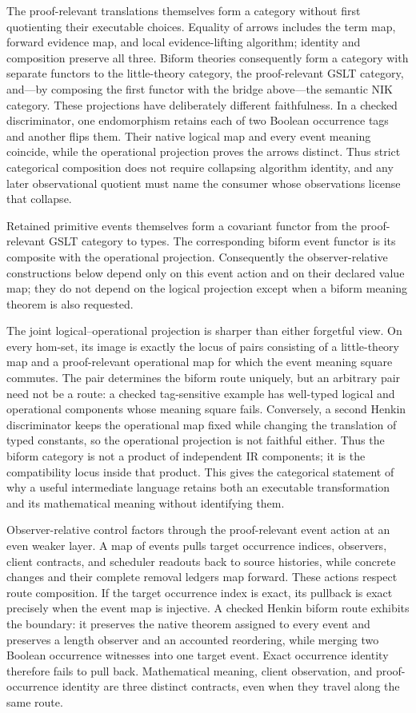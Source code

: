 \documentclass[11pt]{article}
\theoremstyle{definition}
\theoremstyle{remark}
\begin{document}
The proof-relevant translations themselves form a category without first
quotienting their executable choices.  Equality of arrows includes the term
map, forward evidence map, and local evidence-lifting algorithm; identity and
composition preserve all three.  Biform theories consequently form a category
with separate functors to the little-theory category, the proof-relevant GSLT
category, and---by composing the first functor with the bridge above---the
semantic NIK category.  These projections have deliberately different
faithfulness.  In a checked discriminator, one endomorphism retains each of
two Boolean occurrence tags and another flips them.  Their native logical map
and every event meaning coincide, while the operational projection proves the
arrows distinct.  Thus strict categorical composition does not require
collapsing algorithm identity, and any later observational quotient must name
the consumer whose observations license that collapse.

Retained primitive events themselves form a covariant functor from the
proof-relevant GSLT category to types.  The corresponding biform event functor
is its composite with the operational projection.  Consequently the
observer-relative constructions below depend only on this event action and on
their declared value map; they do not depend on the logical projection except
when a biform meaning theorem is also requested.

The joint logical--operational projection is sharper than either forgetful
view.  On every hom-set, its image is exactly the locus of pairs consisting of
a little-theory map and a proof-relevant operational map for which the event
meaning square commutes.  The pair determines the biform route uniquely, but
an arbitrary pair need not be a route: a checked tag-sensitive example has
well-typed logical and operational components whose meaning square fails.
Conversely, a second Henkin discriminator keeps the operational map fixed while
changing the translation of typed constants, so the operational projection is
not faithful either.  Thus the biform category is not a product of independent
IR components; it is the compatibility locus inside that product.  This gives
the categorical statement of why a useful intermediate language retains both
an executable transformation and its mathematical meaning without identifying
them.

Observer-relative control factors through the proof-relevant event action at
an even weaker layer.  A map of events pulls target occurrence indices,
observers, client contracts, and scheduler readouts back to source histories,
while concrete changes and their complete removal ledgers map forward.  These
actions respect route composition.  If the target occurrence index is exact,
its pullback is exact precisely when the event map is injective.  A checked
Henkin biform route exhibits the boundary: it preserves the native theorem
assigned to every event and preserves a length observer and an accounted
reordering, while merging two Boolean occurrence witnesses into one target
event.  Exact occurrence identity therefore fails to pull back.  Mathematical
meaning, client observation, and proof-occurrence identity are three distinct
contracts, even when they travel along the same route.
\end{document}
